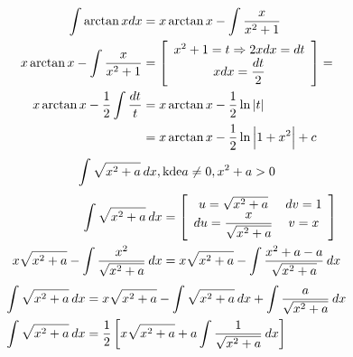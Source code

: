 \begin{mdframed}[style=mdexam]
\begin{example}
    \begin{align*}
       \int{\arctan xdx}                      &= x\arctan x-\int\frac{x}{x^2+1}         \\
       x\arctan x-\int\frac{x}{x^2+1}         &= 
         \left[\begin{array}{c} 
                  x^2 + 1 = t  \Rightarrow 2xdx = dt        \\ 
                      xdx = \displaystyle{\frac{dt}{2}}
               \end{array} 
         \right] =                                                                    \\ 
       x\arctan x-\frac{1}{2}\int\frac{dt}{t} &= x\arctan x-\frac{1}{2}\ln\left\lvert t\right\rvert     \\
         &=   x\arctan x-\frac{1}{2}\ln\left\lvert1+x^2\right\rvert+ c                                 \\
    \end{align*}
    \begin{equation}\label{mai:exam016_003}
      \int{\sqrt{x^2+a}\hspace{2pt}dx}, \text{kde} a\neq0, x^2+a>0
    \end{equation}  
    \begin{align*}
      \int{\sqrt{x^2+a}\hspace{2pt}dx}                           &=
        \left[
          \begin{array}{cc} 
             u =\sqrt{x^2+a}              & dv = 1 \\ 
            du =\displaystyle
                  \frac{x}{\sqrt{x^2+a}}  &  v = x
          \end{array}
        \right]                                                                                   \\
      x\sqrt{x^2+a}-\int{\frac{x^2}{\sqrt{x^2+a}}\hspace{2pt}dx} &= 
        \displaystyle{x\sqrt{x^2+a}-\int{\frac{x^2+a-a}{\sqrt{x^2+a}}\hspace{2pt}dx}}                        
    \end{align*}\vspace*{-1em}
    \begin{align*}
      \int{\sqrt{x^2+a}\hspace{2pt}dx}                           &= 
        \displaystyle{x\sqrt{x^2+a}-\int{\sqrt{x^2+a}\hspace{2pt}dx} + \int{\frac{a}{\sqrt{x^2+a}}\hspace{2pt}dx}}      \\
      \int{\sqrt{x^2+a}\hspace{2pt}dx}                           &= 
        \frac{1}{2}\left[x\sqrt{x^2+a}+a\int{\frac{1}{\sqrt{x^2+a}}}\hspace{2pt}dx\right]
    \end{align*}
    

\end{example}
\end{mdframed}
